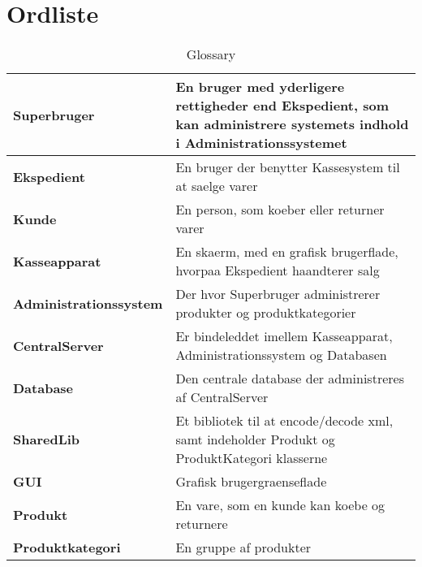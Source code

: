 \chapter{Ordliste}

\begin{table}[H]
	\label{glos}
\begin{tabularx}{\textwidth}{|p{4cm}|X|}
\hline
\textbf{Superbruger} & En bruger med yderligere rettigheder end Ekspedient, som kan administrere systemets indhold i Administrationssystemet\\\hline

\textbf{Ekspedient} & En bruger der benytter Kassesystem til at saelge varer \\\hline

\textbf{Kunde} & En person, som koeber eller returner varer \\\hline

\textbf{Kasseapparat} & En skaerm, med en grafisk brugerflade, hvorpaa Ekspedient haandterer salg \\\hline

\textbf{Administrationssystem} & Der hvor Superbruger administrerer produkter og produktkategorier \\\hline

\textbf{CentralServer} & Er bindeleddet imellem Kasseapparat, Administrationssystem og Databasen \\\hline

\textbf{Database} & Den centrale database der administreres af CentralServer \\\hline

\textbf{SharedLib} & Et bibliotek til at encode/decode xml, samt indeholder Produkt og ProduktKategori klasserne \\\hline

\textbf{GUI} & Grafisk brugergraenseflade \\\hline

\textbf{Produkt} & En vare, som en kunde kan koebe og returnere \\\hline

\textbf{Produktkategori} & En gruppe af produkter \\\hline

\end{tabularx}
\caption{Glossary}
\label{tab:ATspk}
\end{table}